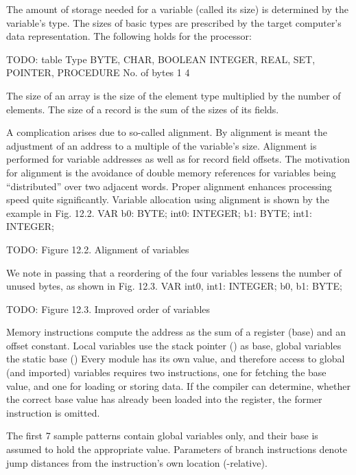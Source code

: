 The amount of storage needed for a variable (called its size) is determined by the variable's type. The sizes of basic types are prescribed by the target computer's data representation. The following holds for the \RISC processor:

TODO: table
Type
BYTE, CHAR, BOOLEAN
INTEGER, REAL, SET, POINTER, PROCEDURE
No. of bytes
1 4

\noindent The size of an array is the size of the element type multiplied by the number of elements. The size of a record is the sum of the sizes of its fields.

A complication arises due to so-called alignment. By alignment is meant the adjustment of an address to a multiple of the variable's size. Alignment is performed for variable addresses as well as for record field offsets. The motivation for alignment is the avoidance of double memory references for variables being ``distributed'' over two adjacent words. Proper alignment enhances processing speed quite significantly. Variable allocation using alignment is shown by the example in Fig. 12.2.
\begintt
VAR b0: BYTE; int0: INTEGER; b1: BYTE; int1: INTEGER;
\endtt

TODO: Figure 12.2. Alignment of variables

\noindent We note in passing that a reordering of the four variables lessens the number of unused bytes, as shown in Fig. 12.3.
\begintt
VAR int0, int1: INTEGER; b0, b1: BYTE;
\endtt

TODO: Figure 12.3. Improved order of variables

Memory instructions compute the address as the sum of a register (base) and an offset constant. Local variables use the stack pointer  () as base, global variables the static base  () Every module has its own  value, and therefore access to global (and imported) variables requires two instructions, one for fetching the base value, and one for loading or storing data. If the compiler can determine, whether the correct base value has already been loaded into the  register, the former instruction is omitted.

The first 7 sample patterns contain global variables only, and their base  is assumed to hold the appropriate value. Parameters of branch instructions denote jump distances from the instruction's own location (-relative).

